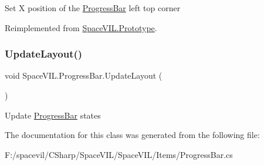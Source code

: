 Set X position of the \mbox{\hyperlink{class_space_v_i_l_1_1_progress_bar}{Progress\+Bar}} left top corner 



Reimplemented from \mbox{\hyperlink{class_space_v_i_l_1_1_prototype}{Space\+V\+I\+L.\+Prototype}}.

\mbox{\label{class_space_v_i_l_1_1_progress_bar_a210b9b1fb096d851fcbc1aa34872f389}} 
\subsubsection{\texorpdfstring{Update\+Layout()}{UpdateLayout()}}
{\footnotesize\ttfamily void Space\+V\+I\+L.\+Progress\+Bar.\+Update\+Layout (\begin{DoxyParamCaption}{ }\end{DoxyParamCaption})}



Update \mbox{\hyperlink{class_space_v_i_l_1_1_progress_bar}{Progress\+Bar}} states 



The documentation for this class was generated from the following file\+:\begin{DoxyCompactItemize}
\item 
F\+:/spacevil/\+C\+Sharp/\+Space\+V\+I\+L/\+Space\+V\+I\+L/\+Items/Progress\+Bar.\+cs\end{DoxyCompactItemize}
